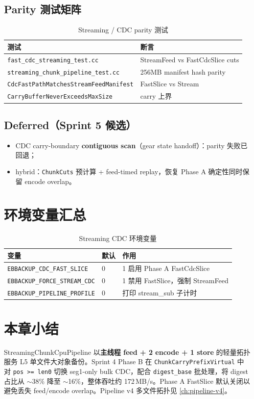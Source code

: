\subsection{Parity 测试矩阵}

\begin{table}[htbp]
\centering
\caption{Streaming / CDC parity 测试}
\small
\begin{tabular}{@{}ll@{}}
\toprule
测试 & 断言 \\
\midrule
\texttt{fast\_cdc\_streaming\_test.cc} & StreamFeed vs FastCdcSlice cuts \\
\texttt{streaming\_chunk\_pipeline\_test.cc} & 256MB manifest hash parity \\
\texttt{CdcFastPathMatchesStreamFeedManifest} & FastSlice vs Stream \\
\texttt{CarryBufferNeverExceedsMaxSize} & carry 上界 \\
\bottomrule
\end{tabular}
\end{table}

\subsection{Deferred（Sprint 5 候选）}

\begin{itemize}[nosep]
  \item CDC carry-boundary \textbf{contiguous scan}（gear state handoff）：parity 失败已回退；
  \item hybrid：\texttt{ChunkCuts} 预计算 + feed-timed replay，恢复 Phase A 确定性同时保留 encode overlap。
\end{itemize}

\section{环境变量汇总}

\begin{table}[htbp]
\centering
\caption{Streaming CDC 环境变量}
\begin{tabular}{@{}llp{6.5cm}@{}}
\toprule
变量 & 默认 & 作用 \\
\midrule
\texttt{EBBACKUP\_CDC\_FAST\_SLICE} & 0 & 1 启用 Phase A FastCdcSlice \\
\texttt{EBBACKUP\_FORCE\_STREAM\_CDC} & 0 & 1 禁用 FastSlice，强制 StreamFeed \\
\texttt{EBBACKUP\_PIPELINE\_PROFILE} & 0 & 打印 stream\_sub 子计时 \\
\bottomrule
\end{tabular}
\end{table}

\section{本章小结}

StreamingChunkCpuPipeline 以\textbf{主线程 feed + 2 encode + 1 store} 的轻量拓扑服务 L5 单文件大对象备份。Sprint 4 Phase B 在 \texttt{ChunkCarryPrefixVirtual} 中对 \texttt{pos >= len0} 切换 seg1-only bulk CDC，配合 \texttt{digest\_base} 批处理，将 digest 占比从 $\sim$38\% 降至 $\sim$16\%，整体吞吐约 172\,MB/s。Phase A FastSlice 默认关闭以避免丢失 feed/encode overlap。Pipeline v4 多文件拓扑见 \cref{ch:pipeline-v4}。
